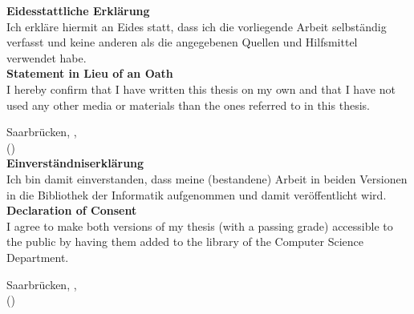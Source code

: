 \vspace*{1cm}
\textbf{\large Eidesstattliche Erkl\"arung}\\[1em]
Ich erkl\"are hiermit an Eides statt, dass ich die vorliegende Arbeit selbst\"andig verfasst 
und keine anderen als die angegebenen Quellen und Hilfsmittel verwendet habe. 
\\[0.3cm]

\textbf{\large Statement in Lieu of an Oath}\\[1em]
I hereby confirm that I have written this thesis on my own and that I have not used any other media or materials than the ones referred to in this thesis.

Saarbr\"ucken, \handindate,\\[1.5cm]
\hspace*{1cm}(\authornames)\\[2cm]

\textbf{\large Einverst\"andniserkl\"arung}\\[1em]
Ich bin damit einverstanden, dass meine (bestandene) Arbeit in beiden Versionen in die Bibliothek der Informatik aufgenommen und damit ver\"offentlicht wird.
\\[0.3cm]

\textbf{\large Declaration of Consent}\\[1em]
I agree to make both versions of my thesis (with a passing grade) accessible to the public by having them added to the library of the Computer Science Department.

Saarbr\"ucken, \handindate,\\[1.5cm]
\hspace*{1cm}(\authornames)
\cleardoublepage

